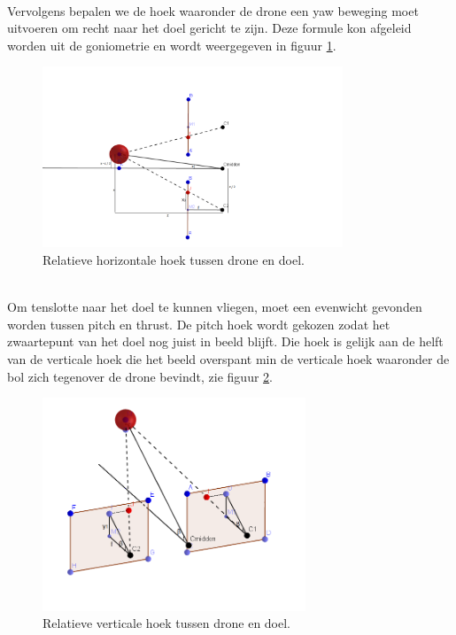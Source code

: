 \\
Vervolgens bepalen we de hoek waaronder de drone een yaw beweging moet uitvoeren om recht naar het doel gericht te zijn. Deze formule kon afgeleid worden uit de goniometrie en wordt weergegeven in figuur \ref{fig:RelatieveHorizontaleHoek}. 
\begin{figure}[h]
	\centering
	\includegraphics[width=0.8\textwidth]{RelatieveHorizontaleHoek.png}
	\caption{Relatieve horizontale hoek tussen drone en doel.}
	\label{fig:RelatieveHorizontaleHoek}
\end{figure}
\\
Om tenslotte naar het doel te kunnen vliegen, moet een evenwicht gevonden worden tussen pitch en thrust. De pitch hoek wordt gekozen zodat het zwaartepunt van het doel nog juist in beeld blijft. Die hoek is gelijk aan de helft van de verticale hoek die het beeld overspant min de verticale hoek waaronder de bol zich tegenover de drone bevindt, zie figuur \ref{fig:RelatieveVerticaleHoek}. 
\begin{figure}[h]
	\centering
	\includegraphics[width=0.7\textwidth]{RelatieveVerticaleHoek.png}
	\caption{Relatieve verticale hoek tussen drone en doel.}
	\label{fig:RelatieveVerticaleHoek}
\end{figure}
